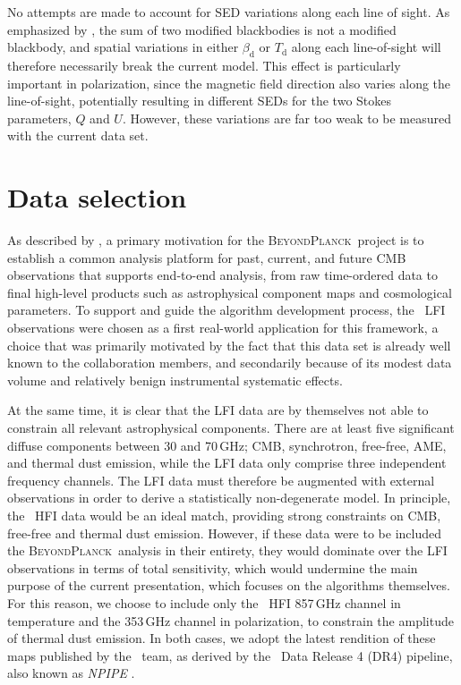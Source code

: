 \documentclass[twocolumn]{aa}
\newcommand{\BP}{\textsc{BeyondPlanck}}
\newcommand{\?}[1]{\textcolor{red}{{\bf [#1]}}}
\begin{document}
No attempts are made to account for SED variations along each line of
sight. As emphasized by \citet{Tassis2015}, the sum of two modified
blackbodies is not a modified blackbody, and spatial variations in
either $\beta_{\mathrm{d}}$ or $T_{\mathrm{d}}$ along each
line-of-sight will therefore necessarily break the current model. This
effect is particularly important in polarization, since the magnetic
field direction also varies along the line-of-sight, potentially
resulting in different SEDs for the two Stokes parameters, $Q$ and
$U$. However, these variations are far too weak to be measured with
the current data set.

\section{Data selection}
\label{sec:data}

As described by \citet{bp01}, a primary motivation for the \BP\ project is to
establish a common analysis platform for past, current, and future CMB
observations that supports end-to-end analysis, from raw time-ordered data to
final high-level products such as astrophysical component maps and cosmological
parameters. To support and guide the algorithm development process, the \Planck\
LFI observations were chosen as a first real-world application for this
framework, a choice that was primarily motivated by the fact that this data set
is already well known to the collaboration members, and secondarily because of its modest
data volume and relatively benign instrumental systematic effects.

At the same time, it is clear that the LFI data are by themselves not able to
constrain all relevant astrophysical components. There are at least five
significant diffuse components between 30 and 70\,GHz; CMB, synchrotron,
free-free, AME, and thermal dust emission, while the LFI data only comprise
three independent frequency channels. The LFI data must therefore be augmented
with external observations in order to derive a statistically non-degenerate
model. In principle, the \Planck\ HFI data \citep{planck2016-l03} would be an
ideal match, providing strong constraints on CMB, free-free and thermal dust
emission. However, if these data were to be included the \BP\ analysis in their
entirety, they would dominate over the LFI observations in terms of total
sensitivity, which  would undermine the main purpose of the current
presentation, which focuses on the algorithms themselves. For this reason, we
choose to include only the \Planck\ HFI 857\,GHz channel in temperature and the
353\,GHz channel in polarization, to constrain the amplitude of thermal dust
emission. In both cases, we adopt the latest rendition of these maps published
by the \Planck\ team, as derived by the \Planck\ Data Release 4 (DR4) pipeline,
also known as \textit{NPIPE} \citep{planck2020-LVII}.
\end{document}
